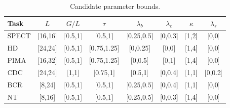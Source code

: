 \begin{table}[!t]
\centering\scriptsize\setlength{\tabcolsep}{1pt}
\caption{Candidate parameter bounds.}
\label{tab:ja-selected-configurations}
\color{revisionblue}
\begin{tabular*}{\columnwidth}{@{\extracolsep{\fill}}lccccccc@{}}
\toprule
Task & $L$ & $G/L$ & $\tau$ & $\lambda_b$ & $\lambda_c$ & $\kappa$ & $\lambda_s$\\
\midrule
SPECT & [16,16] & [0.5,1] & [0.5,1] & [0.25,0.5] & [0,0.3] & [1,2] & [0,0]\\
HD & [24,24] & [0.5,1] & [0.75,1.25] & [0,0.25] & [0,0] & [1,4] & [0,0]\\
PIMA & [16,32] & [0.5,1] & [0.75,1.25] & [0,0.5] & [0,1] & [1,4] & [0,0]\\
CDC & [24,24] & [1,1] & [0.75,1] & [0.5,1] & [0,0.4] & [1,1] & [0,0.2]\\
BCR & [8,24] & [0.5,1] & [0.5,1] & [0.25,0.5] & [0,0.4] & [1,1] & [0,0]\\
NT & [8,16] & [0.5,1] & [0.5,1] & [0.25,0.5] & [0,0.3] & [1,4] & [0,0]\\
\bottomrule
\end{tabular*}
\end{table}
